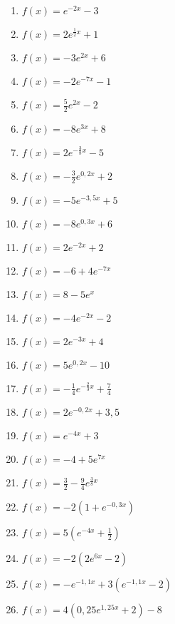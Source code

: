 \begin{Exercise}[title={Bestimme den y-Achsenabschnitt, skizziere das Schaubild, gib die Asymptote, das Verhalten für \(x\rightarrow \pm\infty\) und die Monotonie an}, label=eFktA2]
	\begin{minipage}{\textwidth}
		\begin{minipage}{0.5\textwidth}
			\begin{enumerate}[label=\alph*)]
				\item \(f(x)=e^{-2x}-3\)
				\item \(f(x)=2e^{\frac{1}{2}x}+1\)
				\item \(f(x)=-3e^{2x}+6\)
				\item \(f(x)=-2e^{-7x}-1\)
				\item \(f(x)=\frac{5}{2}e^{2x}-2\)
				\item \(f(x)=-8e^{3x}+8\)
				\item \(f(x)=2e^{-\frac{3}{8}x}-5\)
				\item \(f(x)=-\frac{3}{2}e^{0,2x}+2\)
				\item \(f(x)=-5e^{-3,5x}+5\)
				\item \(f(x)=-8e^{0,3x}+6\)
				\item \(f(x)=2e^{-2x}+2\)
				\item \(f(x)=-6+4e^{-7x}\)
				\item \(f(x)=8-5e^{x}\)
			\end{enumerate}
		\end{minipage}%
		\begin{minipage}{0.5\textwidth}
			\begin{enumerate}[label=\alph*)]
				\setcounter{enumi}{13}
				\item \(f(x)=-4e^{-2x}-2\)
				\item \(f(x)=2e^{-3x}+4\)
				\item \(f(x)=5e^{0,2x}-10\)
				\item \(f(x)=-\frac{1}{4}e^{-\frac{2}{3}x}+\frac{7}{4}\)
                \item \(f(x)=2e^{-0,2x}+3,5\)
				\item \(f(x)=e^{-4x}+3\)
				\item \(f(x)=-4+5e^{7x}\)
				\item \(f(x)=\frac{3}{2}-\frac{9}{4}e^{\frac{3}{8}x}\)
				\item \(f(x)=-2\left(1+e^{-0,3x}\right) \)
				\item \(f(x)=5\left(e^{-4x}+\frac{1}{2}\right) \)
				\item \(f(x)=-2\left( 2e^{6x}-2\right) \)
				\item \(f(x)=-e^{-1,1x}+3\left(e^{-1,1x}-2\right)\)
				\item \(f(x)=4\left( 0,25e^{1,25x}+2\right) -8\)
			\end{enumerate}
		\end{minipage}%
	\end{minipage}
\end{Exercise}
